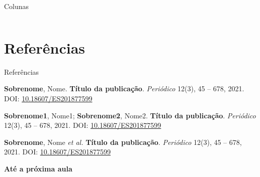 \documentclass[aspectratio=169,xcolor=dvipsnames]{beamer}
\begin{document}
\begin{frame}{Colunas}
    \begin{columns}

        \begin{column}{0.48\textwidth}
            \lipsum[2-2]
        \end{column}
        
        \hspace{-10pt}
        \vrule{}

        \begin{column}{0.48\textwidth}
            \lipsum[2-2]
        \end{column}

    \end{columns}
\end{frame}

\section{Referências}
\begin{frame}{Referências}
    
    \footnotesize{
        \thispagestyle{empty}
        \clearpage
        \begin{thebibliography}{5}
             \textbf{Sobrenome}, Nome.
            \newblock \textbf{Título da publicação}.
            \newblock \emph{Periódico} 12(3), 45 -- 678, 2021.
            \newblock DOI: \href{https://dx.doi.org/10.18607/ES201877599}{10.18607/ES201877599}

             \textbf{Sobrenome1}, Nome1; \textbf{Sobrenome2}, Nome2.
            \newblock \textbf{Título da publicação}.
            \newblock \emph{Periódico} 12(3), 45 -- 678, 2021.
            \newblock DOI: \href{https://dx.doi.org/10.18607/ES201877599}{10.18607/ES201877599}

             \textbf{Sobrenome}, Nome \textit{et al.}
            \newblock \textbf{Título da publicação}.
            \newblock \emph{Periódico} 12(3), 45 -- 678, 2021.
            \newblock DOI: \href{https://dx.doi.org/10.18607/ES201877599}{10.18607/ES201877599}

        \end{thebibliography}
    }
\end{frame}

\begin{frame}
    \Huge{\centerline{\textbf{Até a próxima aula}}}
\end{frame}
\end{document}

